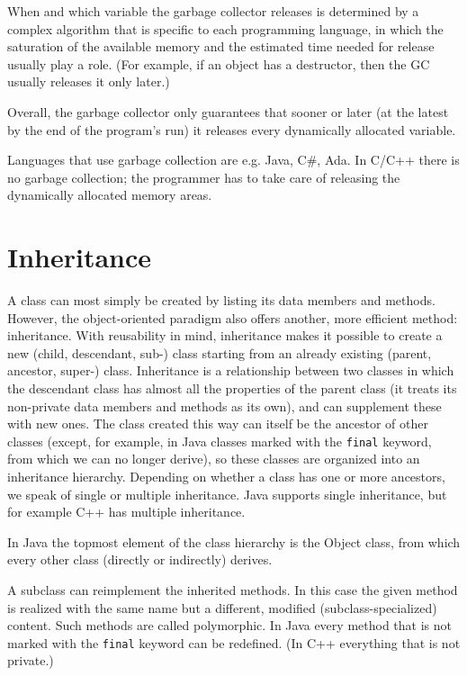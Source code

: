 \documentclass[margin=0px]{article}
\begin{document}
When and which variable the garbage collector releases is determined by a complex algorithm that is specific to each programming language, in which the saturation of the available memory and the estimated time needed for release usually play a role. (For example, if an object has a destructor, then the GC usually releases it only later.)

Overall, the garbage collector only guarantees that sooner or later (at the latest by the end of the program's run) it releases every dynamically allocated variable.

Languages that use garbage collection are e.g. Java, C\#, Ada. In C/C++ there is no garbage collection; the programmer has to take care of releasing the dynamically allocated memory areas.

\section{Inheritance}

A class can most simply be created by listing its data members and methods. However, the object-oriented paradigm also offers another, more efficient method: inheritance. With reusability in mind, inheritance makes it possible to create a new (child, descendant, sub-) class starting from an already existing (parent, ancestor, super-) class. Inheritance is a relationship between two classes in which the descendant class has almost all the properties of the parent class (it treats its non-private data members and methods as its own), and can supplement these with new ones. The class created this way can itself be the ancestor of other classes (except, for example, in Java classes marked with the \texttt{final} keyword, from which we can no longer derive), so these classes are organized into an inheritance hierarchy. Depending on whether a class has one or more ancestors, we speak of single or multiple inheritance. Java supports single inheritance, but for example C++ has multiple inheritance.

In Java the topmost element of the class hierarchy is the Object class, from which every other class (directly or indirectly) derives.

A subclass can reimplement the inherited methods. In this case the given method is realized with the same name but a different, modified (subclass-specialized) content. Such methods are called polymorphic. In Java every method that is not marked with the \texttt{final} keyword can be redefined. (In C++ everything that is not private.)\\
\end{document}

